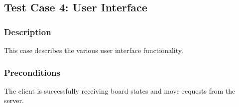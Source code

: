 \documentclass[letterpaper]{article}
\begin{document}
\subsection{Test Case 4: User Interface}
\label{sec:test_display}

\subsubsection{Description}
\label{sec:test_display_des}
This case describes the various user interface functionality.

\subsubsection{Preconditions}
\label{sec:test_display_precon}
The client is successfully receiving board states and move requests from the server.
\end{document}
